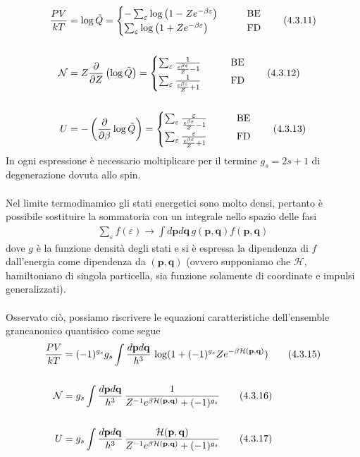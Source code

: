 \documentclass{article}
\begin{document}
\begin{align}
    \frac{PV}{kT} &= \log \tilde{Q} = \begin{cases}
        -\sum_\varepsilon \log\left(1 - Ze^{-\beta\varepsilon}\right) &\qquad \text{BE}\\
        \sum_\varepsilon \log\left(1 + Ze^{-\beta\varepsilon}\right) &\qquad \text{FD}
    \end{cases} \tag{4.3.11} \\ \notag \\
    \mathcal{N} &= Z\frac{\partial}{\partial Z}\left(\log \tilde{Q}\right) = \begin{cases}
        \sum_\varepsilon \frac{1}{\frac{e^{\beta\varepsilon}}{Z} - 1} &\qquad \text{BE} \\
        \sum_\varepsilon \frac{1}{\frac{e^{\beta\varepsilon}}{Z} + 1} &\qquad \text{FD}
    \end{cases} \tag{4.3.12} \\ \notag \\
    U &= -\left(\frac{\partial}{\partial \beta} \log\tilde{Q}\right) = \begin{cases}
        \sum_\varepsilon \frac{\varepsilon}{\frac{e^{\beta\varepsilon}}{Z} - 1} &\qquad \text{BE} \\
        \sum_\varepsilon \frac{\varepsilon}{\frac{e^{\beta\varepsilon}}{Z} + 1} &\qquad \text{FD}
    \end{cases} \tag{4.3.13}
\end{align}
In ogni espressione è necessario moltiplicare per il termine $g_s = 2s + 1$ di degenerazione dovuta allo spin. \\ \\
Nel limite termodinamico gli stati energetici sono molto densi, pertanto è possibile sostituire la sommatoria con un integrale nello spazio delle fasi
\begin{align}
    \sum_\varepsilon f(\varepsilon) \longrightarrow \int d\mathbf{p}d\mathbf{q} \, g(\mathbf{p}, \mathbf{q})f(\mathbf{p}, \mathbf{q}) \tag{4.3.14}
\end{align}
dove $g$ è la funzione densità degli stati e si è espressa la dipendenza di $f$ dall'energia come dipendenza da $(\mathbf{p}, \mathbf{q})$ (ovvero supponiamo che $\mathcal{H}$, hamiltoniano di singola particella, sia funzione solamente di coordinate e impulsi generalizzati). \\ \\
Osservato ciò, possiamo riscrivere le equazioni caratteristiche dell'ensemble grancanonico quantisico come segue
\begin{align}
    \frac{PV}{kT} &= (-1)^{g_s}g_s\int \frac{d\mathbf{p}d\mathbf{q}}{h^3} \, \log(1 + (-1)^{g_s}Ze^{-\beta\mathcal{H}(\mathbf{p}, \mathbf{q})}) \tag{4.3.15} \\ \notag \\
    \mathcal{N} &= g_s\int \frac{d\mathbf{p}d\mathbf{q}}{h^3} \, \frac{1}{Z^{-1}e^{\beta\mathcal{H}(\mathbf{p}, \mathbf{q})} + (-1)^{g_s}} \tag{4.3.16} \\ \notag \\
    U &= g_s\int \frac{d\mathbf{p}d\mathbf{q}}{h^3} \, \frac{\mathcal{H}(\mathbf{p}, \mathbf{q})}{Z^{-1}e^{\beta\mathcal{H}(\mathbf{p}, \mathbf{q})} + (-1)^{g_s}} \tag{4.3.17}
\end{align}
\end{document}
